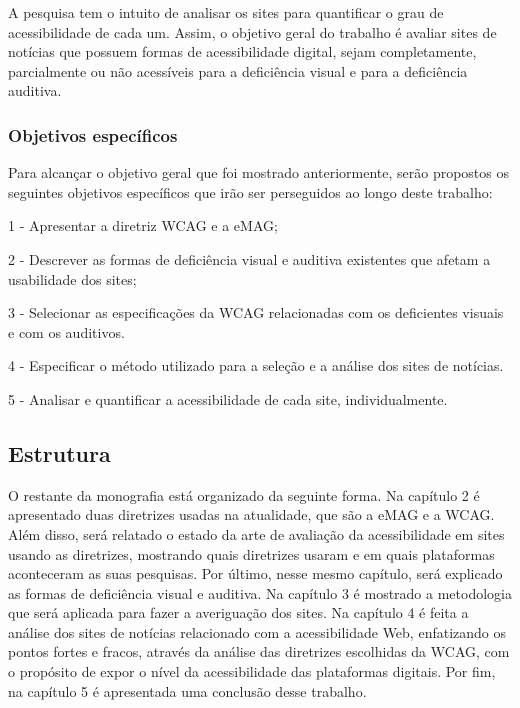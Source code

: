 \documentclass[a4paper]{article}
\begin{document}
\begin{titlepage}
A pesquisa tem o intuito de analisar os sites para quantificar o grau de acessibilidade de cada um. Assim, o objetivo geral do trabalho é avaliar sites de notícias que possuem formas de acessibilidade digital, sejam completamente, parcialmente ou não acessíveis para a deficiência visual e para a deficiência auditiva. 

\subsubsection{Objetivos específicos}

Para alcançar o objetivo geral que foi mostrado anteriormente, serão propostos os seguintes objetivos específicos que irão ser perseguidos ao longo deste trabalho:

1 - Apresentar a diretriz WCAG e a eMAG;

2 - Descrever as formas de deficiência visual e auditiva existentes que afetam a usabilidade dos sites;

3 - Selecionar as especificações da WCAG relacionadas com os deficientes visuais e com os auditivos.

4 - Especificar o método utilizado para a seleção e a análise dos sites de notícias.

5 - Analisar e quantificar a acessibilidade de cada site, individualmente.

\subsection{Estrutura}

O restante da monografia está organizado da seguinte forma.
Na capítulo 2 é apresentado duas diretrizes usadas na atualidade, que são a eMAG e a WCAG. Além disso, será relatado o estado da arte de avaliação da acessibilidade em sites usando as diretrizes, mostrando quais diretrizes usaram e em quais plataformas aconteceram as suas pesquisas. Por último, nesse mesmo capítulo, será explicado as formas de deficiência visual e auditiva.
Na capítulo 3 é mostrado a metodologia que será aplicada para fazer a averiguação dos sites.
Na capítulo 4 é feita a análise dos sites de notícias relacionado com a acessibilidade Web, enfatizando os pontos fortes e fracos, através da análise das diretrizes escolhidas da WCAG, com o propósito de expor o nível da acessibilidade das plataformas digitais.
Por fim, na capítulo 5 é apresentada uma conclusão desse trabalho.\\[14cm]


\end{titlepage}
\end{document}
